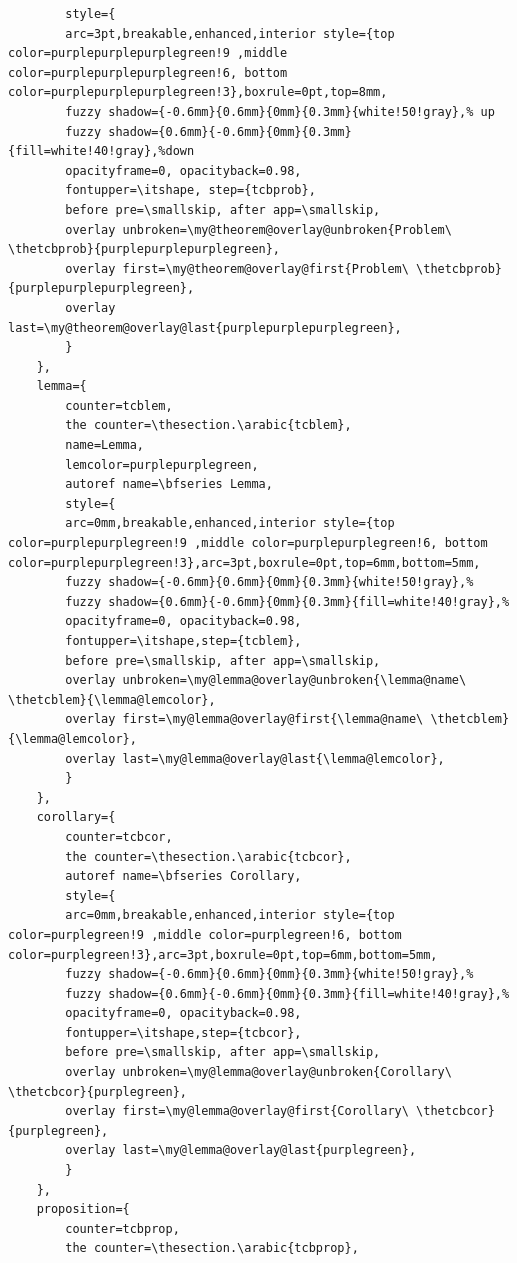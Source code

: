 \documentclass[lang=en,12pt]{beautybook}
\begin{document}
\begin{lstlisting}
        style={
        arc=3pt,breakable,enhanced,interior style={top color=purplepurplepurplegreen!9 ,middle color=purplepurplepurplegreen!6, bottom color=purplepurplepurplegreen!3},boxrule=0pt,top=8mm,
        fuzzy shadow={-0.6mm}{0.6mm}{0mm}{0.3mm}{white!50!gray},% up
        fuzzy shadow={0.6mm}{-0.6mm}{0mm}{0.3mm}{fill=white!40!gray},%down
        opacityframe=0, opacityback=0.98,
        fontupper=\itshape, step={tcbprob},
        before pre=\smallskip, after app=\smallskip,
        overlay unbroken=\my@theorem@overlay@unbroken{Problem\ \thetcbprob}{purplepurplepurplegreen},
        overlay first=\my@theorem@overlay@first{Problem\ \thetcbprob}{purplepurplepurplegreen},
        overlay last=\my@theorem@overlay@last{purplepurplepurplegreen},
        }
    },
    lemma={
        counter=tcblem,
        the counter=\thesection.\arabic{tcblem},
        name=Lemma, 
        lemcolor=purplepurplegreen, 
        autoref name=\bfseries Lemma,
        style={
        arc=0mm,breakable,enhanced,interior style={top color=purplepurplegreen!9 ,middle color=purplepurplegreen!6, bottom color=purplepurplegreen!3},arc=3pt,boxrule=0pt,top=6mm,bottom=5mm,
        fuzzy shadow={-0.6mm}{0.6mm}{0mm}{0.3mm}{white!50!gray},% 
        fuzzy shadow={0.6mm}{-0.6mm}{0mm}{0.3mm}{fill=white!40!gray},%
        opacityframe=0, opacityback=0.98,
        fontupper=\itshape,step={tcblem},
        before pre=\smallskip, after app=\smallskip,
        overlay unbroken=\my@lemma@overlay@unbroken{\lemma@name\ \thetcblem}{\lemma@lemcolor},
        overlay first=\my@lemma@overlay@first{\lemma@name\ \thetcblem}{\lemma@lemcolor},
        overlay last=\my@lemma@overlay@last{\lemma@lemcolor},
        }
    },
    corollary={
        counter=tcbcor,
        the counter=\thesection.\arabic{tcbcor},
        autoref name=\bfseries Corollary,
        style={
        arc=0mm,breakable,enhanced,interior style={top color=purplegreen!9 ,middle color=purplegreen!6, bottom color=purplegreen!3},arc=3pt,boxrule=0pt,top=6mm,bottom=5mm,
        fuzzy shadow={-0.6mm}{0.6mm}{0mm}{0.3mm}{white!50!gray},% 
        fuzzy shadow={0.6mm}{-0.6mm}{0mm}{0.3mm}{fill=white!40!gray},%
        opacityframe=0, opacityback=0.98,
        fontupper=\itshape,step={tcbcor},
        before pre=\smallskip, after app=\smallskip,
        overlay unbroken=\my@lemma@overlay@unbroken{Corollary\ \thetcbcor}{purplegreen},
        overlay first=\my@lemma@overlay@first{Corollary\ \thetcbcor}{purplegreen},
        overlay last=\my@lemma@overlay@last{purplegreen},
        }
    },
    proposition={
        counter=tcbprop,
        the counter=\thesection.\arabic{tcbprop},

\end{lstlisting}
\end{document}
